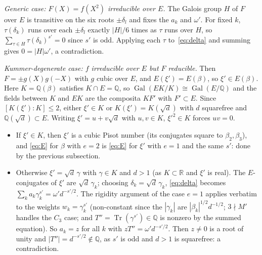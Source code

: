 \documentclass[11pt]{amsart}
\theoremstyle{definition}
\newcommand{\Q}{\mathbb{Q}}
\newcommand{\R}{\mathbb{R}}
\newcommand{\Tr}{\operatorname{Tr}}
\newcommand{\Gal}{\operatorname{Gal}}
\begin{document}
\emph{Generic case: $F(X)=f(X^2)$ irreducible over $E$.}  The Galois group $H$ of $F$ over $E$ is transitive on the six roots $\pm\delta_l$ and fixes the $a_k$ and $\omega'$.  For fixed $k$, $\tau(\delta_k)$ runs over each $\pm\delta_l$ exactly $|H|/6$ times as $\tau$ runs over $H$, so $\sum_{\tau\in H}\tau(\delta_k)^{s'}=0$ since $s'$ is odd.  Applying each $\tau$ to~\eqref{eq:delta} and summing gives $0=|H|\omega'$, a contradiction.

\emph{Kummer-degenerate case: $f$ irreducible over $E$ but $F$ reducible.}  Then $F=\pm g(X)g(-X)$ with $g$ cubic over $E$, and $E(\xi')=E(\beta)$, so $\xi'\in E(\beta)$.  Here $K=\Q(\beta)$ satisfies $K\cap E=\Q$, so $\Gal(EK/K)\cong\Gal(E/\Q)$ and the fields between $K$ and $EK$ are the composita $KF'$ with $F'\subset E$.  Since $[K(\xi'):K]\le2$, either $\xi'\in K$ or $K(\xi')=K(\sqrt d)$ with $d$ squarefree and $\Q(\sqrt d)\subset E$.  Writing $\xi'=u+v\sqrt d$ with $u,v\in K$, $\xi'^2\in K$ forces $uv=0$.
\begin{itemize}
\item If $\xi'\in K$, then $\xi'$ is a cubic Pisot number (its conjugates square to $\beta_2,\beta_3$), and \eqref{eq:E} for $\beta$ with $e=2$ is \eqref{eq:E} for $\xi'$ with $e=1$ and the same $s'$: done by the previous subsection.
\item Otherwise $\xi'=\sqrt d\,\gamma$ with $\gamma\in K$ and $d>1$ (as $K\subset\R$ and $\xi'$ is real).  The $E$-conjugates of $\xi'$ are $\sqrt d\,\gamma_k$; choosing $\delta_k=\sqrt d\,\gamma_k$, \eqref{eq:delta} becomes $\sum_ka_k\gamma_k^{s'}=\omega' d^{-s'/2}$.  The rigidity argument of the case $e=1$ applies verbatim to the weights $w_k=\gamma_k^{s'}$ (non-constant since the $|\gamma_k|$ are $|\beta_k|^{1/2}d^{-1/2}$; $3\nmid M'$ handles the $C_3$ case; and $T''=\Tr(\gamma^{s'})\in\Q$ is nonzero by the summed equation).  So $a_k=z$ for all $k$ with $zT''=\omega'd^{-s'/2}$.  Then $z\neq0$ is a root of unity and $|T''|=d^{-s'/2}\notin\Q$, as $s'$ is odd and $d>1$ is squarefree: a contradiction.
\end{itemize}
\end{document}

